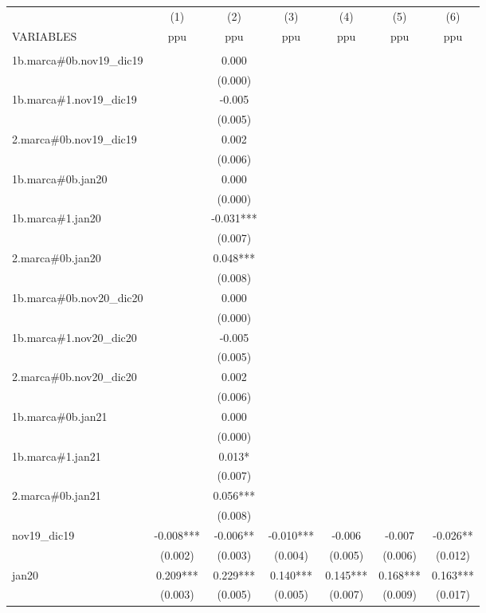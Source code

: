 \begin{tabular}{lcccccc} \hline
 & (1) & (2) & (3) & (4) & (5) & (6) \\
VARIABLES & ppu & ppu & ppu & ppu & ppu & ppu \\ \hline
 &  &  &  &  &  &  \\
1b.marca\#0b.nov19\_dic19 &  & 0.000 &  &  &  &  \\
 &  & (0.000) &  &  &  &  \\
1b.marca\#1.nov19\_dic19 &  & -0.005 &  &  &  &  \\
 &  & (0.005) &  &  &  &  \\
2.marca\#0b.nov19\_dic19 &  & 0.002 &  &  &  &  \\
 &  & (0.006) &  &  &  &  \\
1b.marca\#0b.jan20 &  & 0.000 &  &  &  &  \\
 &  & (0.000) &  &  &  &  \\
1b.marca\#1.jan20 &  & -0.031*** &  &  &  &  \\
 &  & (0.007) &  &  &  &  \\
2.marca\#0b.jan20 &  & 0.048*** &  &  &  &  \\
 &  & (0.008) &  &  &  &  \\
1b.marca\#0b.nov20\_dic20 &  & 0.000 &  &  &  &  \\
 &  & (0.000) &  &  &  &  \\
1b.marca\#1.nov20\_dic20 &  & -0.005 &  &  &  &  \\
 &  & (0.005) &  &  &  &  \\
2.marca\#0b.nov20\_dic20 &  & 0.002 &  &  &  &  \\
 &  & (0.006) &  &  &  &  \\
1b.marca\#0b.jan21 &  & 0.000 &  &  &  &  \\
 &  & (0.000) &  &  &  &  \\
1b.marca\#1.jan21 &  & 0.013* &  &  &  &  \\
 &  & (0.007) &  &  &  &  \\
2.marca\#0b.jan21 &  & 0.056*** &  &  &  &  \\
 &  & (0.008) &  &  &  &  \\
nov19\_dic19 & -0.008*** & -0.006** & -0.010*** & -0.006 & -0.007 & -0.026** \\
 & (0.002) & (0.003) & (0.004) & (0.005) & (0.006) & (0.012) \\
jan20 & 0.209*** & 0.229*** & 0.140*** & 0.145*** & 0.168*** & 0.163*** \\
 & (0.003) & (0.005) & (0.005) & (0.007) & (0.009) & (0.017) \\

\end{tabular}
